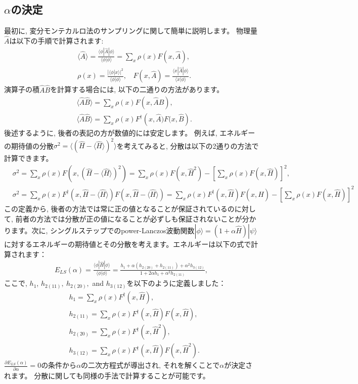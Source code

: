\subsection{$\alpha$の決定}
最初に, 変分モンテカルロ法のサンプリングに関して簡単に説明します。
物理量$\hat{A}$は以下の手順で計算されます:
\begin{align}
&\langle \hat{A}\rangle = \frac{\langle \phi| \hat{A}|\phi \rangle}{\langle \phi| \phi \rangle} = \sum_{x} \rho(x) F(x, {\hat{A}}),\\
& \rho(x)=\frac{|\langle \phi|x\rangle|^2}{\langle \phi | \phi \rangle}, ~~~~F(x,  {\hat{A}}) =  \frac{\langle x| \hat{A}|\phi \rangle}{\langle x| \phi \rangle}.
\end{align}
演算子の積$\hat{A}\hat{B}$を計算する場合には, 以下の二通りの方法があります。
\begin{align}
&\langle \hat{A} \hat{B}\rangle = \sum_{x} \rho(x) F(x, {\hat{A}\hat{B}}),\\
&\langle \hat{A} \hat{B}\rangle = \sum_{x} \rho(x) F^{\dag}(x, {\hat{A})F(x, \hat{B}}).
\end{align}
後述するように, 後者の表記の方が数値的には安定します。
例えば, エネルギーの期待値の分散$\sigma^2=\langle (\hat{H}-\langle \hat{H}\rangle)^2\rangle$を考えてみると, 
分散は以下の2通りの方法で計算できます。
\begin{align}
&\sigma^2=\sum_{x} \rho(x) F(x,  (\hat{H}-\langle \hat{H}\rangle)^2) = \sum_{x} \rho(x) F(x,  \hat{H}^2) - \left[ \sum_{x} \rho(x) F(x,  \hat{H})\right]^2 ,\\
&\sigma^2=\sum_{x} \rho(x) F^{\dag}(x,  \hat{H}-\langle \hat{H}\rangle)F(x,  \hat{H}-\langle \hat{H}\rangle) = \sum_{x} \rho(x) F^{\dag}(x,  \hat{H}) F(x, \hat{H})- \left[ \sum_{x} \rho(x) F(x,  \hat{H})\right]^2 
\end{align}
この定義から, 後者の方法では常に正の値となることが保証されているのに対して, 前者の方法では分散が正の値になることが必ずしも保証されないことが分かります。次に, シングルステップでのpower-Lanczos波動関数$|\phi\rangle =(1+\alpha \hat{H}) |\psi \rangle$に対するエネルギーの期待値とその分散を考えます。エネルギーは以下の式で計算されます：
\begin{align}
E_{LS}(\alpha) =\frac{\langle \phi| \hat{H} |\phi\rangle}{\langle \phi|\phi\rangle}=\frac{h_1 + \alpha(h_{2(20)} + h_{2(11)}) + \alpha^2 h_{3(12)}}{1 + 2\alpha h_1 + \alpha^2 h_{2(11)}},
\end{align}
ここで, $h_1$, $h_{2(11)},~h_{2(20)},$ and $h_{3(12)}$を以下のように定義しました：
\begin{align}
&h_1 =\sum_{x} \rho(x) F^{\dag}(x,  \hat{H}),\\
&h_{2(11)}=\sum_{x} \rho(x) F^{\dag}(x,  \hat{H}) F(x, \hat{H}),\\
&h_{2(20)}=\sum_{x} \rho(x) F^{\dag}(x,  \hat{H}^2),\\
&h_{3(12)}=\sum_{x} \rho(x) F^{\dag}(x,  \hat{H})F(x,  \hat{H}^2).
\end{align}
$\frac{\partial E_{LS}(\alpha)}{\partial \alpha}=0$の条件から$\alpha$の二次方程式が導出され, それを解くことで$\alpha$が決定されます。
分散に関しても同様の手法で計算することが可能です。
